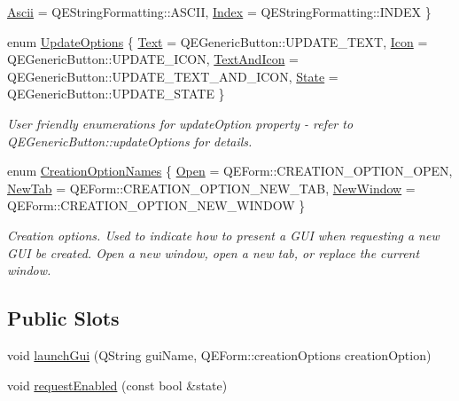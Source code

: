 \begin{DoxyCompactItemize}
\hyperlink{classQECheckBox_a5e41abe405ee8fca4bb9dbfbde1c1061a45457d5d10be4c0d688df7b27794fa1b}{Ascii} =  QEStringFormatting::ASCII, 
\hyperlink{classQECheckBox_a5e41abe405ee8fca4bb9dbfbde1c1061aadd9beefbd06033076dba9c97d7d8300}{Index} =  QEStringFormatting::INDEX
 \}
\item 
enum \hyperlink{classQECheckBox_aae0115012f096f2271246683f4d338fe}{UpdateOptions} \{ \hyperlink{classQECheckBox_aae0115012f096f2271246683f4d338fea9d6ffdaabf9459f4f0880d9fe2b6a779}{Text} =  QEGenericButton::UPDATE\_\-TEXT, 
\hyperlink{classQECheckBox_aae0115012f096f2271246683f4d338fea40bfe6a4851acac1dbd8db08c0d0db45}{Icon} =  QEGenericButton::UPDATE\_\-ICON, 
\hyperlink{classQECheckBox_aae0115012f096f2271246683f4d338fea1095879efc5283f935b88abe772bbefe}{TextAndIcon} =  QEGenericButton::UPDATE\_\-TEXT\_\-AND\_\-ICON, 
\hyperlink{classQECheckBox_aae0115012f096f2271246683f4d338fea442a3a58509531dab46425c0b92158bb}{State} =  QEGenericButton::UPDATE\_\-STATE
 \}
\begin{DoxyCompactList}\small\item\em User friendly enumerations for updateOption property -\/ refer to QEGenericButton::updateOptions for details. \end{DoxyCompactList}\item 
enum \hyperlink{classQECheckBox_ae961d2f2273ccca3b41faf87f0b87cf0}{CreationOptionNames} \{ \hyperlink{classQECheckBox_ae961d2f2273ccca3b41faf87f0b87cf0a3f4b841d5b22e26029f56f26bcf21d05}{Open} =  QEForm::CREATION\_\-OPTION\_\-OPEN, 
\hyperlink{classQECheckBox_ae961d2f2273ccca3b41faf87f0b87cf0acaa17e90bb1ed20c250fc512dbeeb54f}{NewTab} =  QEForm::CREATION\_\-OPTION\_\-NEW\_\-TAB, 
\hyperlink{classQECheckBox_ae961d2f2273ccca3b41faf87f0b87cf0abcbcc60d5124e0b269e650d42c9b5675}{NewWindow} =  QEForm::CREATION\_\-OPTION\_\-NEW\_\-WINDOW
 \}
\begin{DoxyCompactList}\small\item\em Creation options. Used to indicate how to present a GUI when requesting a new GUI be created. Open a new window, open a new tab, or replace the current window. \end{DoxyCompactList}\end{DoxyCompactItemize}
\subsection*{Public Slots}
\begin{DoxyCompactItemize}
\item 
void \hyperlink{classQECheckBox_a8d31468a25d01bb06a83043e3f6ab71b}{launchGui} (QString guiName, QEForm::creationOptions creationOption)
\item 
void \hyperlink{classQECheckBox_a1da96128241bbfcbe6000a1858172a09}{requestEnabled} (const bool \&state)
\end{DoxyCompactItemize}
